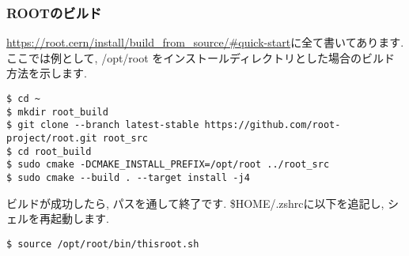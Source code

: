 \subsubsection{ROOTのビルド}
\url{https://root.cern/install/build_from_source/#quick-start}に全て書いてあります.
ここでは例として, /opt/root をインストールディレクトリとした場合のビルド方法を示します.
\begin{lstlisting}
$ cd ~
$ mkdir root_build
$ git clone --branch latest-stable https://github.com/root-project/root.git root_src
$ cd root_build
$ sudo cmake -DCMAKE_INSTALL_PREFIX=/opt/root ../root_src
$ sudo cmake --build . --target install -j4
\end{lstlisting}
ビルドが成功したら, パスを通して終了です.
\$HOME/.zshrcに以下を追記し, シェルを再起動します.
\begin{lstlisting}
$ source /opt/root/bin/thisroot.sh
\end{lstlisting}
